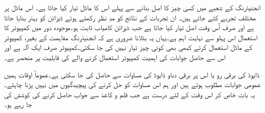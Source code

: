 	انجنیئرنگ کے شعبے میں کسی چیز کا اصل بنانے سے پہلے اس کا ماڈل تیار کیا جاتا ہے۔ اس ماڈل پر مختلف تجربے کئے جاتے ہیں۔ ان تجربات کے نتائج کو مدِ نظر رکھتے ہوئے ڈیزائن کو بہتر بنایا جاتا ہے اور صرف اُس وقت اصل تیار کیا جاتا ہے جب ڈیزائن کامیاب ثابت ہو۔موجودہ دور میں  کمپیوٹر کا استعمال اس پہلو سے نہایت اہم ہے۔یہاں یہ بتلانا ضروری ہے کہ انجنیئرنگ مفاہمت کے بغیر، کمپیوٹر کے ماڈل استعمال کرتے کبھی بھی کوئی چیز تیار نہیں کی جا سکتی۔کمپیوٹر صرف ایک آلہ ہے اور اس سے حاصل جوابات کی اہمیت کمپیوٹر استعمال کرنے والے کی قابلیت پر منحصر ہے۔

ڈایوڈ کی برقی رو یا اس پر برقی دباو ڈایوڈ کی مساوات سے حاصل کی جا سکتی ہے۔عموماً اوقات ہمیں عمومی جوابات مطلوب ہوتے ہیں اور ہم اس مساوات کو حل کرنے کی پیچیدگیوں میں نہیں پڑنا چاہتے۔یہ بات خاص کر اس وقت کے لئے درست ہے جب قلم و کاغذ سے جواب حاصل کرنے کی کوشش کی جا رہے ہو۔

